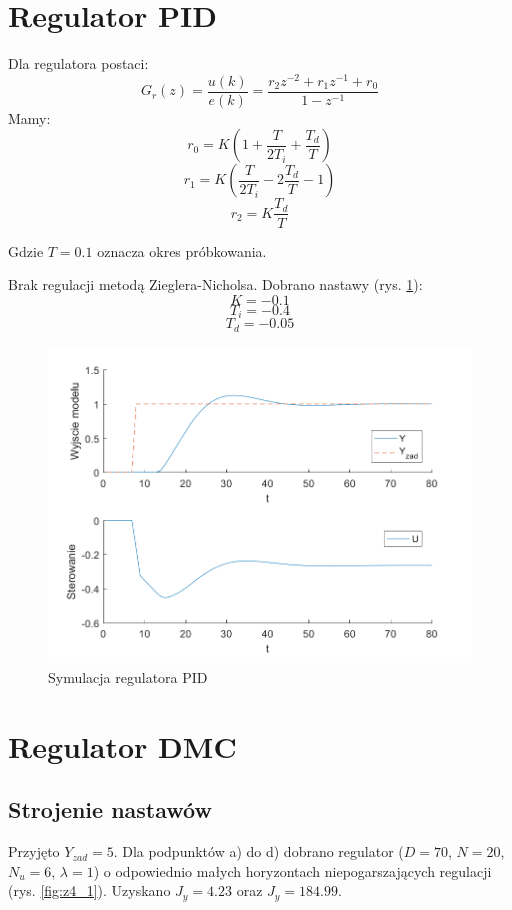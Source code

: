 \documentclass[a4paper, 10pt]{article}
\begin{document}
	\section{Regulator PID}
	Dla regulatora postaci:
	\[G_r(z)=\frac{u(k)}{e(k)} = \frac{r_2z^{-2}+r_1z^{-1}+r_0}{1-z^{-1}}\]
	Mamy:
	\[r_0=K(1+\frac{T}{2T_i}+\frac{T_d}{T})\]
	\[r_1=K(\frac{T}{2T_i}-2\frac{T_d}{T}-1)\]
	\[r_2=K\frac{T_d}{T}\]
	
	Gdzie $T=0.1$ oznacza okres próbkowania.
	
	Brak regulacji metodą Zieglera-Nicholsa. Dobrano nastawy (rys. \ref{fig:z3}):
	\[K = -0.1\]
	\[T_i = -0.4\]
	\[T_d = -0.05\]
	
		
	\begin{figure}[H]
			\centering
			\includegraphics[width=0.9\linewidth]{z3}
			\caption{Symulacja regulatora PID}
			\label{fig:z3}
			\end{figure}
	
	\section{Regulator DMC}
	\subsection{Strojenie nastawów}
	Przyjęto $Y_{zad}=5$. Dla podpunktów a) do d) dobrano regulator ($D=70$, $N=20$, $N_u=6$, $\lambda=1$) o odpowiednio małych horyzontach niepogarszających regulacji (rys. \ref{fig:z4_1}). Uzyskano $J_y=4.23$ oraz $J_y = 184.99$.
	
\end{document}
